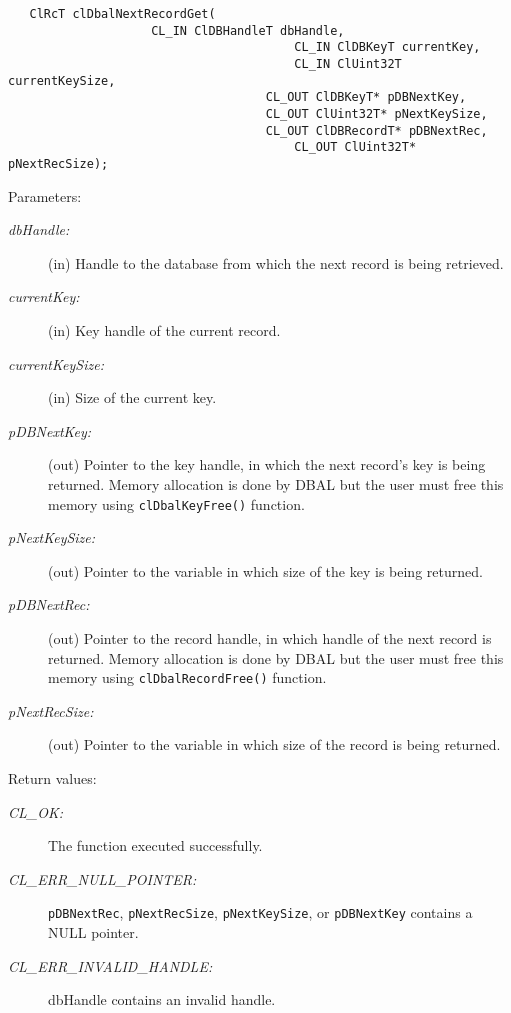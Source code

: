 \begin{flushleft}
\begin{Desc}
\footnotesize\begin{verbatim}   ClRcT clDbalNextRecordGet(
					CL_IN ClDBHandleT dbHandle,
                                        CL_IN ClDBKeyT currentKey,
                                        CL_IN ClUint32T currentKeySize,
                            		CL_OUT ClDBKeyT* pDBNextKey,
                            		CL_OUT ClUint32T* pNextKeySize,
                            		CL_OUT ClDBRecordT* pDBNextRec,
                                        CL_OUT ClUint32T* pNextRecSize);
\end{verbatim}
\normalsize
\end{Desc}
\begin{Desc}
\item[Parameters:]
\begin{description}
\item[{\em db\-Handle:}](in) Handle to the database from which the next record is being retrieved. 
\item[{\em current\-Key:}](in) Key handle of the current record. 
\item[{\em current\-Key\-Size:}](in) Size of the current key.
\item[{\em p\-DBNext\-Key:}](out) Pointer to the key handle, in which the next record's key is being returned. Memory allocation is done by DBAL but the 
user must free this memory using {\tt{cl\-Dbal\-Key\-Free()}} function.
\item[{\em p\-Next\-Key\-Size:}](out) Pointer to the variable in which size of the key is being returned.
\item[{\em p\-DBNext\-Rec:}](out) Pointer to the record handle, in which handle of the next
record is returned. Memory allocation is done by DBAL but the user must free this memory using {\tt{cl\-Dbal\-Record\-Free()}} function.
\item[{\em p\-Next\-Rec\-Size:}](out) Pointer to the variable in which size of the record is being returned.\end{description}
\end{Desc}
\begin{Desc}
\item[Return values:]
\begin{description}
\item[{\em CL\_\-OK:}]The function executed successfully. 
\item[{\em CL\_\-ERR\_\-NULL\_\-POINTER:}]{\tt{pDBNextRec}}, {\tt{pNextRecSize}}, {\tt{pNextKeySize}}, or {\tt{pDBNextKey}} contains a NULL pointer. 
\item[{\em CL\_\-ERR\_\-INVALID\_\-HANDLE:}]dbHandle contains an invalid handle. 

\end{description}
\end{Desc}
\end{flushleft}
